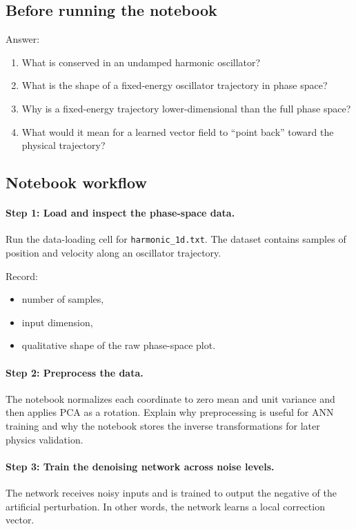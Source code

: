 \documentclass[11pt]{article}
\begin{document}
\subsection*{Before running the notebook}
Answer:
\begin{enumerate}
    \item What is conserved in an undamped harmonic oscillator?
    \item What is the shape of a fixed-energy oscillator trajectory in phase space?
    \item Why is a fixed-energy trajectory lower-dimensional than the full phase space?
    \item What would it mean for a learned vector field to ``point back'' toward the physical trajectory?
\end{enumerate}

\subsection*{Notebook workflow}

\paragraph{Step 1: Load and inspect the phase-space data.}
Run the data-loading cell for \texttt{harmonic\_1d.txt}. The dataset contains samples of position and velocity along an oscillator trajectory.

Record:
\begin{itemize}
    \item number of samples,
    \item input dimension,
    \item qualitative shape of the raw phase-space plot.
\end{itemize}

\paragraph{Step 2: Preprocess the data.}
The notebook normalizes each coordinate to zero mean and unit variance and then applies PCA as a rotation. Explain why preprocessing is useful for ANN training and why the notebook stores the inverse transformations for later physics validation.

\paragraph{Step 3: Train the denoising network across noise levels.}
The network receives noisy inputs and is trained to output the negative of the artificial perturbation. In other words, the network learns a local correction vector.
\end{document}
